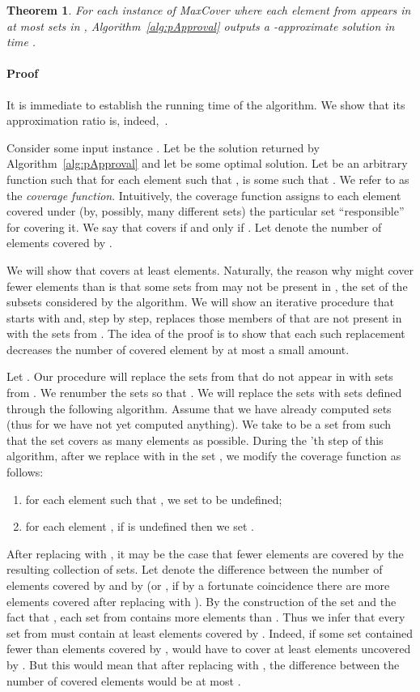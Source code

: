 \documentclass[11pt]{article}
\newtheorem{theorem}{Theorem}
\newenvironment{proof}{\paragraph{Proof}}{\hfill\medskip}
\begin{document}
\begin{theorem}\label{thm:pApproval}
  For each instance  of MaxCover where each element
  from  appears in at most  sets in ,
  Algorithm~\ref{alg:pApproval} outputs a -approximate solution
  in time .
\end{theorem}
\begin{proof}
  It is immediate to establish the running time of the algorithm.  We
  show that its approximation ratio is, indeed,~.

  Consider some input instance .  Let  be the solution
  returned by Algorithm~\ref{alg:pApproval} and let  be
  some optimal solution. Let  be an arbitrary function such that
  for each element  such that ,
   is some  such that . We refer to
   as the \emph{coverage function}. Intuitively, the coverage
  function assigns to each element covered under  (by,
  possibly, many different sets) the particular set ``responsible''
  for covering it.
We say that  covers  if and only if . Let 
  denote the number of elements covered by .

  We will show that  covers at least 
  elements. Naturally, the reason why  might cover fewer
  elements than  is that some sets from  may not
  be present in , the set of the subsets considered by the algorithm.
  We will show an iterative procedure that
  starts with  and, step by step, replaces those members of
   that are not present in  with the sets from
  . The idea of the proof is to show that each such replacement
  decreases the number of covered element by at most a small amount.

  Let . Our procedure will
  replace the  sets from  that do not appear in 
  with  sets from .  We renumber the sets so that
  . We will
  replace the sets  with sets  defined through the following algorithm.  Assume
  that we have already computed sets  (thus
  for  we have not yet computed anything). We take  to be a
  set from  such that the set  covers as many
  elements as possible. During the 'th step of this algorithm,
  after we replace  with  in the set ,
  we modify the coverage function as follows:
  \begin{enumerate}
  \item for each element  such that , we set  to be undefined;
  \item for each element , if  is undefined then we set .
  \end{enumerate}

  After replacing  with , it may be the case that fewer
  elements are covered by the resulting collection of sets. Let 
  denote the difference between the number of elements covered by
   and by  (or , if by a
  fortunate coincidence there are more elements covered after
  replacing  with ). By the construction of the set 
  and the fact that , each set from 
  contains more elements than . Thus we infer that every set from
   must contain at least  elements covered by
  . Indeed, if some set 
  contained fewer than  elements covered by ,
   would have to cover at least  elements uncovered by . But this would
  mean that after replacing  with , the difference between
  the number of covered elements would be at most .





\end{proof}
\end{document}
